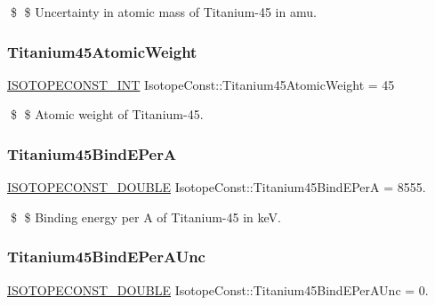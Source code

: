 \$ \$ Uncertainty in atomic mass of Titanium-\/45 in amu. \mbox{\label{group___isotope_const-_titanium-_ti45_gacc2f6e7e6000eda1fb7a813d3fe51984}} 
\subsubsection{\texorpdfstring{Titanium45\+Atomic\+Weight}{Titanium45AtomicWeight}}
{\footnotesize\ttfamily \mbox{\hyperlink{group___isotope_const-_macros_ga5f18360b3e99483a35c32d789e62621c}{I\+S\+O\+T\+O\+P\+E\+C\+O\+N\+S\+T\+\_\+\+I\+NT}} Isotope\+Const\+::\+Titanium45\+Atomic\+Weight = 45}

\$ \$ Atomic weight of Titanium-\/45. \mbox{\label{group___isotope_const-_titanium-_ti45_ga76397de51980e59a2a8720adaf73d75c}} 
\subsubsection{\texorpdfstring{Titanium45\+Bind\+E\+PerA}{Titanium45BindEPerA}}
{\footnotesize\ttfamily \mbox{\hyperlink{group___isotope_const-_macros_ga8f45a7272ce02c0b4c65c44636ed719a}{I\+S\+O\+T\+O\+P\+E\+C\+O\+N\+S\+T\+\_\+\+D\+O\+U\+B\+LE}} Isotope\+Const\+::\+Titanium45\+Bind\+E\+PerA = 8555.}

\$ \$ Binding energy per A of Titanium-\/45 in keV. \mbox{\label{group___isotope_const-_titanium-_ti45_ga6005e194d3213f3266a8ed6a0bc98b48}} 
\subsubsection{\texorpdfstring{Titanium45\+Bind\+E\+Per\+A\+Unc}{Titanium45BindEPerAUnc}}
{\footnotesize\ttfamily \mbox{\hyperlink{group___isotope_const-_macros_ga8f45a7272ce02c0b4c65c44636ed719a}{I\+S\+O\+T\+O\+P\+E\+C\+O\+N\+S\+T\+\_\+\+D\+O\+U\+B\+LE}} Isotope\+Const\+::\+Titanium45\+Bind\+E\+Per\+A\+Unc = 0.}

